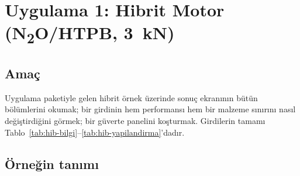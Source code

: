 \documentclass[11pt,a4paper]{article}
\begin{document}
\section{Uygulama 1: Hibrit Motor (N\textsubscript{2}O/HTPB, 3~kN)}\label{sec:uyg-hibrit}

\subsection{Amaç}

Uygulama paketiyle gelen hibrit örnek üzerinde sonuç ekranının bütün
bölümlerini okumak; bir girdinin hem performansı hem bir malzeme sınırını
nasıl değiştirdiğini görmek; bir güverte panelini koşturmak. Girdilerin
tamamı Tablo~\ref{tab:hib-bilgi}--\ref{tab:hib-yapilandirma}'dadır.

\subsection{Örneğin tanımı}
\end{document}
